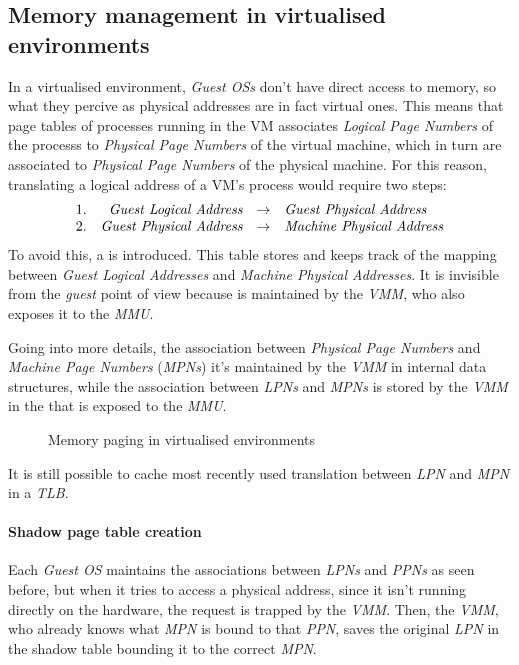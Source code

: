 \subsection{Memory management in virtualised environments}
In a virtualised environment, \emph{Guest OSs} don't have direct access to memory,
so what they percive as physical addresses are in fact virtual ones. This means
that page tables of processes running in the VM associates \emph{Logical Page
Numbers} of the processs to \emph{Physical Page Numbers} of the virtual machine,
which in turn are associated to \emph{Physical Page Numbers} of the physical
machine. For this reason, translating a logical address of a VM's process would
require two steps:
\[\begin{array}{lrcl}
    1. & \emph{Guest Logical Address} & \to & \emph{Guest Physical Address}\\
    2. & \emph{Guest Physical Address} & \to & \emph{Machine Physical Address}
\end{array}\]
To avoid this, a  is introduced. This table stores and keeps
track of the mapping between \emph{Guest Logical Addresses} and \emph{Machine
Physical Addresses}. It is invisible from the \emph{guest} point of view
because is maintained by the \emph{VMM}, who also exposes it to the \emph{MMU}.

Going into more details, the association between \emph{Physical Page Numbers}
and \emph{Machine Page Numbers} (\emph{MPNs}) it's maintained by the \emph{VMM}
in internal data structures, while the association between \emph{LPNs} and
\emph{MPNs} is stored by the \emph{VMM} in the  that is
exposed to the \emph{MMU}.

\begin{figure}[h!]
    \centering
    \caption{Memory paging in virtualised environments}
\end{figure}

\noindent
It is still possible to cache most recently used translation between \emph{LPN}
and \emph{MPN} in a \emph{TLB}.

\paragraph{Shadow page table creation}
Each \emph{Guest OS} maintains the associations between \emph{LPNs} and
\emph{PPNs} as seen before, but when it tries to access a physical address,
since it isn't running directly on the hardware, the request is trapped by the
\emph{VMM}. Then, the \emph{VMM}, who already knows what \emph{MPN} is bound to
that \emph{PPN}, saves the original \emph{LPN} in the shadow table bounding it
to the correct \emph{MPN}.


